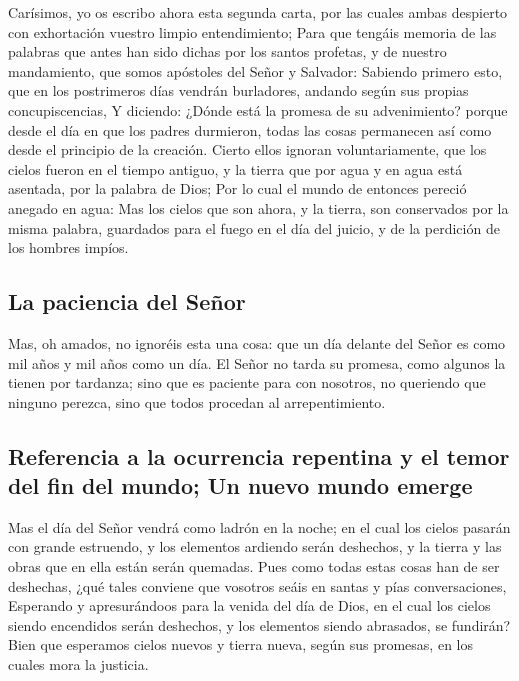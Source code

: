  Carísimos, yo os escribo ahora esta segunda carta, por las
cuales ambas despierto con exhortación vuestro limpio entendimiento;
 Para que tengáis memoria de las palabras que antes han sido
dichas por los santos profetas, y de nuestro mandamiento, que somos
apóstoles del Señor y Salvador:  Sabiendo primero esto, que
en los postrimeros días vendrán burladores, andando según sus propias
concupiscencias,  Y diciendo: ¿Dónde está la promesa de su
advenimiento? porque desde el día en que los padres durmieron, todas las
cosas permanecen así como desde el principio de la creación.
 Cierto ellos ignoran voluntariamente, que los cielos fueron
en el tiempo antiguo, y la tierra que por agua y en agua está asentada,
por la palabra de Dios;  Por lo cual el mundo de entonces
pereció anegado en agua:  Mas los cielos que son ahora, y la
tierra, son conservados por la misma palabra, guardados para el fuego en
el día del juicio, y de la perdición de los hombres impíos.

\hypertarget{la-paciencia-del-seuxf1or}{%
\subsection{La paciencia del Señor}\label{la-paciencia-del-seuxf1or}}

 Mas, oh amados, no ignoréis esta una cosa: que un día
delante del Señor es como mil años y mil años como un día. 
El Señor no tarda su promesa, como algunos la tienen por tardanza; sino
que es paciente para con nosotros, no queriendo que ninguno perezca,
sino que todos procedan al arrepentimiento.

\hypertarget{referencia-a-la-ocurrencia-repentina-y-el-temor-del-fin-del-mundo-un-nuevo-mundo-emerge}{%
\subsection{Referencia a la ocurrencia repentina y el temor del fin del
mundo; Un nuevo mundo
emerge}\label{referencia-a-la-ocurrencia-repentina-y-el-temor-del-fin-del-mundo-un-nuevo-mundo-emerge}}

 Mas el día del Señor vendrá como ladrón en la noche; en el
cual los cielos pasarán con grande estruendo, y los elementos ardiendo
serán deshechos, y la tierra y las obras que en ella están serán
quemadas.  Pues como todas estas cosas han de ser
deshechas, ¿qué tales conviene que vosotros seáis en santas y pías
conversaciones,  Esperando y apresurándoos para la venida
del día de Dios, en el cual los cielos siendo encendidos serán
deshechos, y los elementos siendo abrasados, se fundirán? 
Bien que esperamos cielos nuevos y tierra nueva, según sus promesas, en
los cuales mora la justicia.

